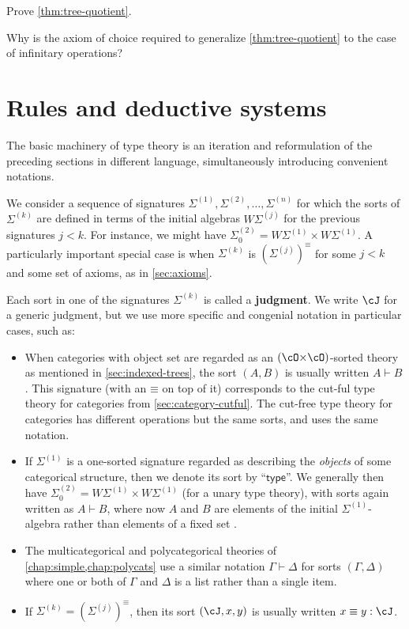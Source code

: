 \documentclass{book}
\def\sig{\Sigma}
\def\equivsym{\mathord{\equiv}}
\let\types\vdash
\begin{document}
\begin{ex}\label{ex:tree-quotient}
  Prove \cref{thm:tree-quotient}.
\end{ex}

\begin{ex}\label{ex:infop-ac}
  Why is the axiom of choice required to generalize \cref{thm:tree-quotient} to the case of infinitary operations?
\end{ex}


\section{Rules and deductive systems}
\label{sec:rules}

The basic machinery of type theory is an iteration and reformulation of the preceding sections in different language, simultaneously introducing convenient notations.

We consider a sequence of signatures $\sig^{(1)},\sig^{(2)},\dots,\sig^{(n)}$ for which the sorts of $\sig^{(k)}$ are defined in terms of the initial algebras $W\sig^{(j)}$ for the previous signatures $j<k$.
For instance, we might have $\sig^{(2)}_0 = W\sig^{(1)} \times W\sig^{(1)}$.
A particularly important special case is when $\sig^{(k)}$ is $(\sig^{(j)})^{\equivsym}$ for some $j<k$ and some set of axioms, as in \cref{sec:axioms}.

Each sort in one of the signatures $\sig^{(k)}$ is called a \textbf{judgment}.
We write $\cJ$ for a generic judgment, but we use more specific and congenial notation in particular cases, such as:
\begin{itemize}
\item When categories with object set \cO are regarded as an $(\cO\times\cO)$-sorted theory as mentioned in \cref{sec:indexed-trees}, the sort $(A,B)$ is usually written $A\types B$.
  This signature (with an $\equivsym$ on top of it) corresponds to the cut-ful type theory for categories from \cref{sec:category-cutful}.
  The cut-free type theory for categories has different operations but the same sorts, and uses the same notation.
\item If $\sig^{(1)}$ is a one-sorted signature regarded as describing the \emph{objects} of some categorical structure, then we denote its sort by ``$\mathsf{type}$''.
  We generally then have $\sig^{(2)}_0 = W\sig^{(1)} \times W\sig^{(1)}$ (for a unary type theory), with sorts again written as $A\types B$, where now $A$ and $B$ are elements of the initial $\sig^{(1)}$-algebra rather than elements of a fixed set \cO.
\item The multicategorical and polycategorical theories of \cref{chap:simple,chap:polycats} use a similar notation $\Gamma\types\Delta$ for sorts $(\Gamma,\Delta)$ where one or both of $\Gamma$ and $\Delta$ is a list rather than a single item.
\item If $\sig^{(k)}=(\sig^{(j)})^{\equivsym}$, then its sort $(\cJ,x,y)$ is usually written $x\equiv y : \cJ$.
\end{itemize}
\end{document}
